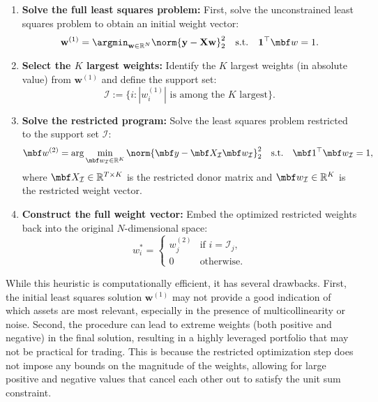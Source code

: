 \begin{enumerate}
\item \textbf{Solve the full least squares problem:} First, solve the unconstrained least squares problem to obtain an initial weight vector:
\begin{equation*}
\mathbf{w}^{(1)} 
= 
\argmin_{\mathbf{w} \in \mathbb{R}^{N}} 
\norm{\mathbf{y} - \mathbf{X}\mathbf{w}}_2^2
\quad \text{s.t.} \quad \mathbf{1}^\top \mbf w = 1.
\end{equation*}

\item \textbf{Select the $K$ largest weights:} Identify the $K$ largest weights (in absolute value) from $\mathbf{w}^{(1)}$ and define the support set:
\begin{equation*}
\mathcal{I} := \{i : |w_i^{(1)}| \text{ is among the $K$ largest}\}.
\end{equation*}

\item \textbf{Solve the restricted program:} Solve the least squares problem restricted to the support set $\mathcal{I}$:
\begin{equation*}
	\mbf w^{(2)} = \arg \min_{\mbf w_{\mathcal I} \in \mathbb{R}^K} \norm{\mbf y - \mbf X_{\mathcal I}\mbf w_{\mathcal I}}_{2}^{2}
\quad \text{s.t.} \quad 
\mbf 1^\top \mbf w_{\mathcal I} = 1,
\end{equation*}
where $\mbf X_{\mathcal{I}} \in \mathbb{R}^{T \times K}$ is the restricted donor matrix and $\mbf w_{\mathcal{I}} \in \mathbb{R}^{K}$ is the restricted weight vector.

\item \textbf{Construct the full weight vector:} Embed the optimized restricted weights back into the original $N$-dimensional space:
\begin{equation*}
	w^*_i = 
\begin{cases}
w^{(2)}_j & \text{if } i = \mathcal{I}_j, \\
0 & \text{otherwise}.
\end{cases}
\end{equation*}
\end{enumerate}

While this heuristic is computationally efficient, it has several drawbacks. First, the initial least squares solution $\mathbf{w}^{(1)}$ may not provide a good indication of which assets are most relevant, especially in the presence of multicollinearity or noise. Second, the procedure can lead to extreme weights (both positive and negative) in the final solution, resulting in a highly leveraged portfolio that may not be practical for trading. This is because the restricted optimization step does not impose any bounds on the magnitude of the weights, allowing for large positive and negative values that cancel each other out to satisfy the unit sum constraint.

